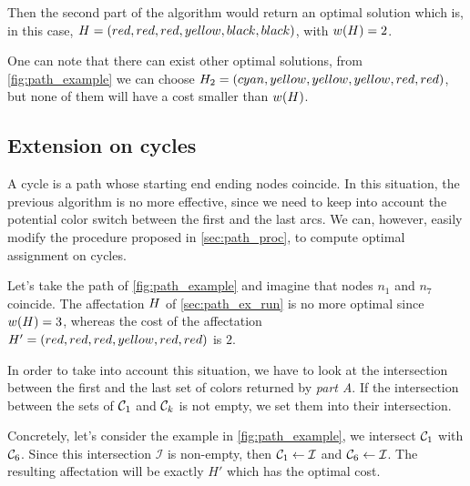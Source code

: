 Then the second part of the algorithm would return an optimal solution which is, in this case, $H = (red, red, red, yellow, black, black)$, with $w(H) = 2$.

One can note that there can exist other optimal solutions, from \cref{fig:path_example} we can choose $H_2 = (cyan, yellow, yellow, yellow, red, red)$, but none of them will have a cost smaller than $w(H)$.

\subsection{Extension on cycles}

A cycle is a path whose starting end ending nodes coincide.
In this situation, the previous algorithm is no more effective, since we need to keep into account the potential color switch between the first and the last arcs.
We can, however, easily modify the procedure proposed in \cref{sec:path_proc}, to compute optimal assignment on cycles.

Let's take the path of \cref{fig:path_example} and imagine that nodes $n_1$ and $n_7$ coincide.
The affectation $H$ of \cref{sec:path_ex_run} is no more optimal since $w(H) = 3$, whereas the cost of the affectation $H' = (red, red, red, yellow, red, red)$ is $2$.

In order to take into account this situation, we have to look at the intersection between the first and the last set of colors returned by \textit{part A}. If the intersection between the sets of $\mathcal{C}_1$ and $\mathcal{C}_k$ is not empty, we set them into their intersection.

Concretely, let's consider the example in \cref{fig:path_example}, we intersect $\mathcal{C}_1$ with $\mathcal{C}_6$. Since this intersection $\mathcal{I}$ is non-empty, then $\mathcal{C}_1 \gets \mathcal{I}$ and $\mathcal{C}_6 \gets \mathcal{I}$. The resulting affectation will be exactly $H'$ which has the optimal cost.

